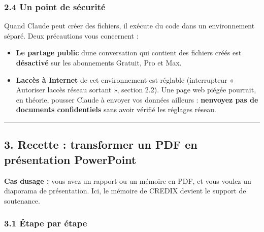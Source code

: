 \documentclass[
  french,
  11pt,
  a4paper,
]{article}
\providecommand{\tightlist}{%
  \setlength{\itemsep}{0pt}\setlength{\parskip}{0pt}}
\begin{document}
\subsubsection{2.4 Un point de
sécurité}\label{24-un-point-de-suxe9curituxe9}

Quand Claude peut créer des fichiers, il exécute du code dans un
environnement séparé. Deux précautions vous concernent :

\begin{itemize}
\tightlist
\item
  \textbf{Le partage public} d\textquotesingle une conversation qui
  contient des fichiers créés est \textbf{désactivé} sur les abonnements
  Gratuit, Pro et Max.
\item
  \textbf{L\textquotesingle accès à Internet} de cet environnement est
  réglable (interrupteur « Autoriser l\textquotesingle accès réseau
  sortant », section 2.2). Une page web piégée pourrait, en théorie,
  pousser Claude à envoyer vos données ailleurs :
  \textbf{n\textquotesingle envoyez pas de documents confidentiels} sans
  avoir vérifié les réglages réseau.
\end{itemize}

\begin{center}\rule{0.5\linewidth}{0.5pt}\end{center}

\subsection{3. Recette : transformer un PDF en présentation
PowerPoint}\label{3-recette--transformer-un-pdf-en-pruxe9sentation-powerpoint}

\textbf{Cas d\textquotesingle usage :} vous avez un rapport ou un
mémoire en PDF, et vous voulez un diaporama de présentation. Ici, le
mémoire de CREDIX devient le support de soutenance.

\subsubsection{3.1 Étape par étape}\label{31-uxe9tape-par-uxe9tape}
\end{document}
